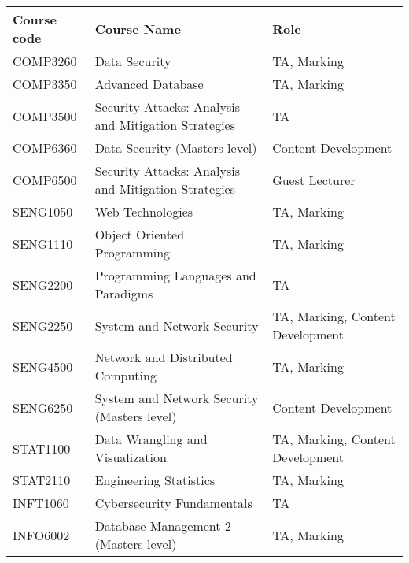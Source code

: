 \documentclass{myresume}
\begin{document}
            \begin{center}
            \begin{tabular}{ l l l }
                    \hline
                    \textbf{Course code} & \textbf{Course Name} & \textbf{Role} \\
                    \hline
                    COMP3260 & Data Security & TA, Marking \\
                    COMP3350 & Advanced Database & TA, Marking \\
                    COMP3500 & Security Attacks: Analysis and Mitigation Strategies & TA \\
                    COMP6360 & Data Security (Masters level) & Content Development \\
                    COMP6500 & Security Attacks: Analysis and Mitigation Strategies & Guest Lecturer \\
                    SENG1050 & Web Technologies & TA, Marking \\
                    SENG1110 & Object Oriented Programming & TA, Marking \\
                    SENG2200 & Programming Languages and Paradigms & TA \\
                    SENG2250 & System and Network Security & TA, Marking, Content Development \\
                    SENG4500 & Network and Distributed Computing & TA, Marking \\
                    SENG6250 & System and Network Security (Masters level) & Content Development \\
                    STAT1100 & Data Wrangling and Visualization & TA, Marking, Content Development \\
                    STAT2110 & Engineering Statistics & TA, Marking \\
                    INFT1060 & Cybersecurity Fundamentals & TA \\
                    INFO6002 & Database Management 2 (Masters level) & TA, Marking \\
                    \hline
            \end{tabular}
            \end{center}



    	
	\nocite{*}
	
\end{document}
